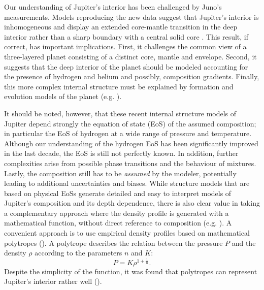 \documentclass[usenatbib]{mnras}
\begin{document}
Our understanding of Jupiter's interior has been challenged by Juno's measurements. 
Models reproducing the new data suggest that Jupiter's interior is inhomogeneous and display an extended core-mantle transition in the deep interior rather than a sharp boundary with a central solid core \cite{2017Wahl, Debras_2019}. 
This result, if correct, has important implications. 
First, it challenges the common view of a three-layered planet consisting of a distinct core, mantle and envelope. 
Second, it suggests that the deep interior of the planet should be modeled accounting for the presence of hydrogen and helium and possibly, composition gradients.
Finally, this more complex internal structure must be explained by formation and evolution models of the planet (e.g. \cite{HelledStevenson2017, Vazan2018, Muller2019}).   

It should be noted, however, that these recent internal structure models of Jupiter depend strongly the equation of state (EoS) of the assumed composition; in particular the EoS of hydrogen at a wide range of pressure and temperature. 
Although our understanding of the hydrogen EoS has been significantly improved in the last decade, the EoS is still not perfectly known. In addition, further complexities arise from possible phase transitions and the behaviour of mixtures. Lastly, the composition still has to be \emph{assumed} by the modeler, potentially leading to additional uncertainties and biases.
While structure models that are based on physical EoSs generate detailed and easy to interpret models of Jupiter's composition and its depth dependence, there is also clear value in taking a complementary approach where the density profile is generated with a mathematical function, without direct reference to composition (e.g. \cite{Helled2009,Helled2011_jup, Movshovitz2019, Ni2018}).
A convenient approach is to use empirical density profiles based on mathematical polytropes (\cite{Hubbard1975, Movshovitz2019}).
A polytrope describes the relation between the pressure $P$ and the density $\rho$ according to the parameters $n$ and $K$: 
\begin{equation}
    P = K\rho^{1+\frac{1}{n}}.
    \label{eq:polytrope}
\end{equation}
Despite the simplicity of the function, it was found that polytropes can represent Jupiter's interior rather well (\cite{Hubbard1975, Hubbard1999}). \\ %
\end{document}
